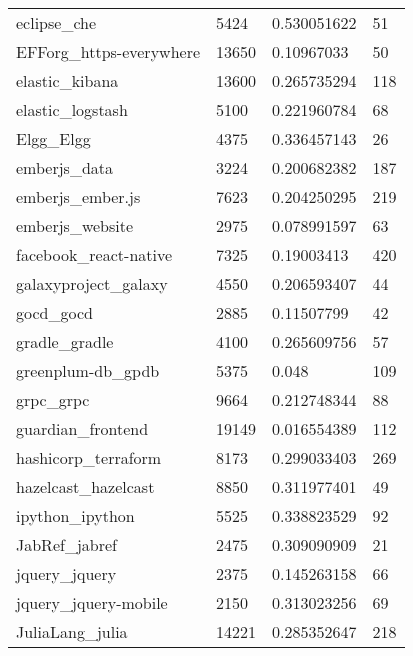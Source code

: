 \begin{center}
\begin{longtable}{l|l|l|l}
eclipse\_che                                 & 5424     & 0.530051622     & 51  \\
EFForg\_https-everywhere                     & 13650    & 0.10967033      & 50  \\
elastic\_kibana                              & 13600    & 0.265735294     & 118 \\
elastic\_logstash                            & 5100     & 0.221960784     & 68  \\
Elgg\_Elgg                                   & 4375     & 0.336457143     & 26  \\
emberjs\_data                                & 3224     & 0.200682382     & 187 \\
emberjs\_ember.js                            & 7623     & 0.204250295     & 219 \\
emberjs\_website                             & 2975     & 0.078991597     & 63  \\
facebook\_react-native                       & 7325     & 0.19003413      & 420 \\
galaxyproject\_galaxy                        & 4550     & 0.206593407     & 44  \\
gocd\_gocd                                   & 2885     & 0.11507799      & 42  \\
gradle\_gradle                               & 4100     & 0.265609756     & 57  \\
greenplum-db\_gpdb                           & 5375     & 0.048           & 109 \\
grpc\_grpc                                   & 9664     & 0.212748344     & 88  \\
guardian\_frontend                           & 19149    & 0.016554389     & 112 \\
hashicorp\_terraform                         & 8173     & 0.299033403     & 269 \\
hazelcast\_hazelcast                         & 8850     & 0.311977401     & 49  \\
ipython\_ipython                             & 5525     & 0.338823529     & 92  \\
JabRef\_jabref                               & 2475     & 0.309090909     & 21  \\
jquery\_jquery                               & 2375     & 0.145263158     & 66  \\
jquery\_jquery-mobile                        & 2150     & 0.313023256     & 69  \\
JuliaLang\_julia                             & 14221    & 0.285352647     & 218 \\

\end{longtable}
\end{center}
